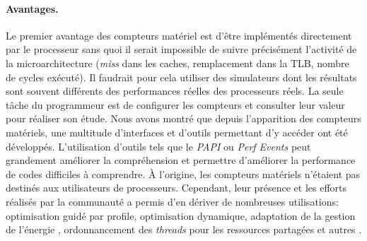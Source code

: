         \paragraph{Avantages.} Le premier avantage des compteurs matériel est d'être implémentés directement par le processeur sans quoi il serait impossible de suivre précisément l'activité de la microarchitecture (\textit{miss} dans les caches, remplacement dans la TLB, nombre de cycles exécuté). Il faudrait pour cela utiliser des simulateurs dont les résultats sont souvent différents des performances réelles des processeurs réels. La seule tâche du programmeur est de configurer les compteurs et consulter leur valeur pour réaliser son étude.
        Nous avons montré que depuis l'apparition des compteurs matériels, une multitude d'interfaces et d'outils permettant d'y accéder ont été développés. L'utilisation d'outils tels que le \textit{PAPI} ou \textit{Perf Events} peut grandement améliorer la compréhension et permettre d'améliorer la performance de codes difficiles à comprendre. 
        À l'origine, les compteurs matériels n'étaient pas destinés aux utilisateurs de processeurs. Cependant, leur présence et les efforts réalisés par la communauté a permis d'en dériver de nombreuses utilisations: \cite{Moseley2011} optimisation guidé par profile\cite{Cavazos2006a}, optimisation dynamique\cite{Dai2005}, adaptation de la gestion de l'énergie \cite{Isci2005}, ordonnancement des \textit{threads} pour les ressources partagées\cite{Moseley2006} et autres \cite{Shye2005, Shye2008}.
        
